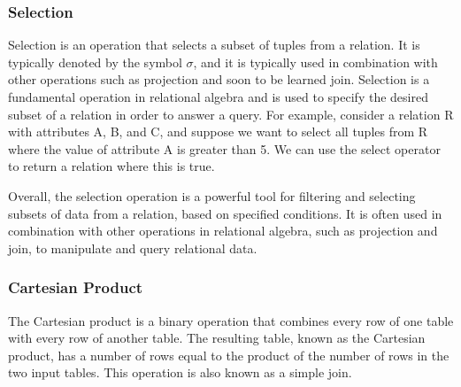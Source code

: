 \documentclass{report}
\begin{document}
        \subsubsection{Selection} 
            Selection is an operation that selects a subset of tuples from a relation. It is typically denoted by the symbol $\sigma$, and it is typically used in combination with other operations such as projection and soon to be learned join. Selection is a fundamental operation in relational algebra and is used to specify the desired subset of a relation in order to answer a query. For example, consider a relation R with attributes A, B, and C, and suppose we want to select all tuples from R where the value of attribute A is greater than 5. We can use the select operator to return a relation where this is true.


             Overall, the selection operation is a powerful tool for filtering and selecting subsets of data from a relation, based on specified conditions. It is often used in combination with other operations in relational algebra, such as projection and join, to manipulate and query relational data.

        \subsubsection{Cartesian Product}   

        The Cartesian product is a binary operation that combines every row of one table with every row of another table. The resulting table, known as the Cartesian product, has a number of rows equal to the product of the number of rows in the two input tables. This operation is also known as a simple join. 
\end{document}
